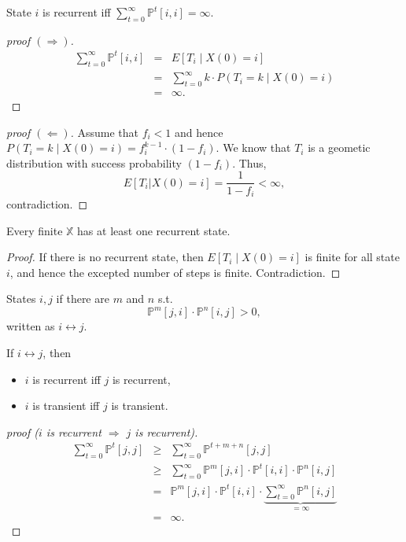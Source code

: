 \begin{lemma}
State $ i $ is recurrent iff $ \sum_{t = 0}^{\infty} \mathbb{P}^{t}[i, i] = \infty $.
\begin{proof}[proof $ (\Rightarrow) $]
\begin{eqnarray*}
\sum_{t = 0}^{\infty} \mathbb{P}^{t}[i, i]
  & = & E[T_{i} \mid X(0) = i] \\
  & = & \sum_{t = 0}^{\infty} k \cdot P(T_{i} = k \mid X(0) = i) \\
  & = & \infty.
\end{eqnarray*}
\end{proof}

\begin{proof}[proof $ (\Leftarrow) $]
Assume that $ f_{i} < 1 $ and hence $ P(T_{i} = k \mid X(0) = i) = f_{i}^{k - 1} \cdot (1 - f_{i}) $. We know that $ T_{i} $ is a geometic distribution with success probability $ (1 - f_{i}) $. Thus,
\[ E[T_{i} | X(0) = i] = \frac{1}{1 - f_{i}} < \infty, \]
contradiction.
\end{proof}
\end{lemma}

\begin{corollary} \label{cor:finite-X-has-recurrent-state}
Every finite $ \mathbb{X} $ has at least one recurrent state.
\begin{proof}
If there is no recurrent state, then $ E[T_{i} \mid X(0) = i] $ is finite for all state $ i $, and hence the excepted number of steps is finite. Contradiction.
\end{proof}
\end{corollary}

\begin{definition}
States $ i, j $  if there are $ m $ and $ n $ s.t.
\[ \mathbb{P}^{m}[j, i] \cdot \mathbb{P}^{n}[i, j] > 0, \]
written as $ i \leftrightarrow j $.
\end{definition}

\begin{lemma} \label{lem:communicate}
If $ i \leftrightarrow j $, then
\begin{itemize}
  \item $ i $ is recurrent iff $ j $ is recurrent,
  \item $ i $ is transient iff $ j $ is transient.
\end{itemize}
\begin{proof}[proof ($ i $ is recurrent $ \Rightarrow $ $ j $ is recurrent)]
\begin{eqnarray*}
\sum_{t = 0}^{\infty} \mathbb{P}^{t}[j, j]
  & \ge & \sum_{t = 0}^{\infty} \mathbb{P}^{t + m + n}[j, j] \\
  & \ge & \sum_{t = 0}^{\infty} \mathbb{P}^{m}[j, i] \cdot \mathbb{P}^{t}[i, i] \cdot \mathbb{P}^{n}[i, j] \\
  & = & \mathbb{P}^{m}[j, i] \cdot \mathbb{P}^{t}[i, i] \cdot \underbrace{\sum_{t = 0}^{\infty} \mathbb{P}^{n}[i, j]}_{= \infty} \\
  & = & \infty.
\end{eqnarray*}
\end{proof}
\end{lemma}

